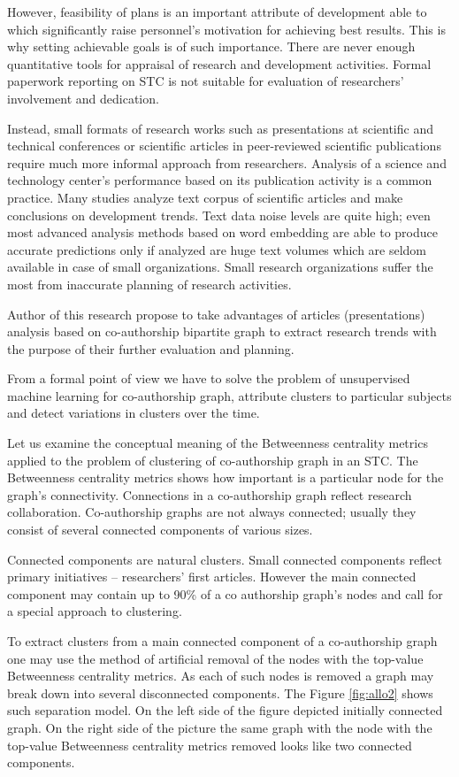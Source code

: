 \documentclass[12pt]{report}
\theoremstyle{definition}
\begin{document}
However, feasibility of plans is an important attribute of development able to which significantly raise personnel’s motivation for achieving best results. This is why setting achievable goals is of such importance. 
There are never enough quantitative tools for appraisal of research and development activities. Formal paperwork reporting on STC is not suitable for evaluation of researchers’ involvement and dedication. 

Instead, small formats of research works such as presentations at scientific and technical conferences or scientific articles in peer-reviewed scientific publications require much more informal approach from researchers. Analysis of a science and technology center’s performance based on its publication activity is a common practice. Many studies analyze text corpus of scientific articles and make conclusions on development trends. Text data noise levels are quite high; even most advanced analysis methods based on word embedding are able to produce accurate predictions only if analyzed are huge text volumes which are seldom available in case of small organizations. Small research organizations suffer the most from inaccurate planning of research activities.

Author of this research propose to take advantages of articles (presentations) analysis based on co-authorship bipartite graph to extract research trends with the purpose of their further evaluation and planning.

From a formal point of view we have to solve the problem of unsupervised machine learning for co-authorship graph, attribute clusters to particular subjects and detect variations in clusters over the time.

Let us examine the conceptual meaning of the Betweenness centrality metrics applied to the problem of clustering of co-authorship graph in an STC. The Betweenness centrality metrics shows how important is a particular node for the graph’s connectivity. Connections in a co-authorship graph reflect research collaboration. Co-authorship graphs are not always connected; usually they consist of several connected components of various sizes. 

Connected components are natural clusters. Small connected components reflect primary initiatives – researchers’ first articles. However the main connected component may contain up to 90\% of a co authorship graph’s nodes and call for a special approach to clustering. 

To extract clusters from a main connected component of a co-authorship graph one may use the method of artificial removal of the nodes with the top-value Betweenness centrality metrics. As each of such nodes is removed a graph may break down into several disconnected components. The Figure \ref{fig:allo2} shows such separation model.  On the left side of the figure depicted initially connected graph. On the right side of the picture the same graph with the node with the top-value Betweenness centrality metrics removed looks like two connected components.
\end{document}
